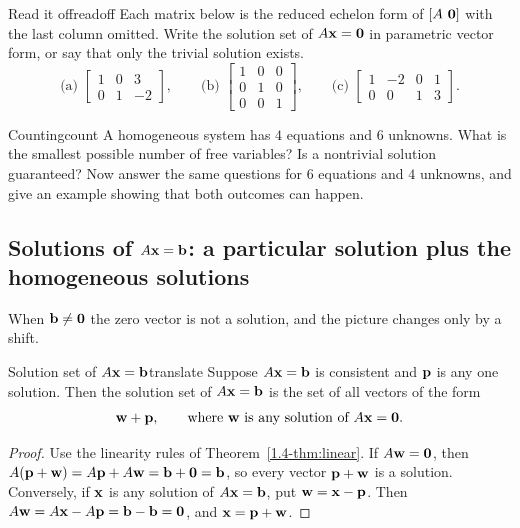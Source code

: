 \documentclass[11pt]{article}
\begin{document}
\begin{kc}{Read it off}{readoff}
Each matrix below is the reduced echelon form of $[A\ \mathbf{0}]$ with the last column omitted. Write the solution set of $A\mathbf{x}=\mathbf{0}$ in parametric vector form, or say that only the trivial solution exists.
\[
\text{(a) }\begin{bmatrix}1&0&3\\0&1&-2\end{bmatrix},\qquad
\text{(b) }\begin{bmatrix}1&0&0\\0&1&0\\0&0&1\end{bmatrix},\qquad
\text{(c) }\begin{bmatrix}1&-2&0&1\\0&0&1&3\end{bmatrix}.
\]
\end{kc}

\begin{kc}{Counting}{count}
A homogeneous system has $4$ equations and $6$ unknowns. What is the smallest possible number of free variables? Is a nontrivial solution guaranteed? Now answer the same questions for $6$ equations and $4$ unknowns, and give an example showing that both outcomes can happen.
\end{kc}

\subsection*{Solutions of $A\mathbf{x}=\mathbf{b}$: a particular solution plus the homogeneous solutions}

When $\mathbf{b}\neq\mathbf{0}$ the zero vector is not a solution, and the picture changes only by a shift.

\begin{thm}{Solution set of $A\mathbf{x}=\mathbf{b}$}{translate}
Suppose $A\mathbf{x}=\mathbf{b}$ is consistent and $\mathbf{p}$ is any one solution. Then the solution set of $A\mathbf{x}=\mathbf{b}$ is the set of all vectors of the form
\[
\mathbf{w}+\mathbf{p},\qquad\text{where }\mathbf{w}\text{ is any solution of }A\mathbf{x}=\mathbf{0}.
\]
\end{thm}

\begin{proof}
Use the linearity rules of Theorem~\ref{1.4-thm:linear}. If $A\mathbf{w}=\mathbf{0}$, then $A(\mathbf{p}+\mathbf{w})=A\mathbf{p}+A\mathbf{w}=\mathbf{b}+\mathbf{0}=\mathbf{b}$, so every vector $\mathbf{p}+\mathbf{w}$ is a solution.
Conversely, if $\mathbf{x}$ is any solution of $A\mathbf{x}=\mathbf{b}$, put $\mathbf{w}=\mathbf{x}-\mathbf{p}$. Then $A\mathbf{w}=A\mathbf{x}-A\mathbf{p}=\mathbf{b}-\mathbf{b}=\mathbf{0}$, and $\mathbf{x}=\mathbf{p}+\mathbf{w}$.
\end{proof}
\end{document}
